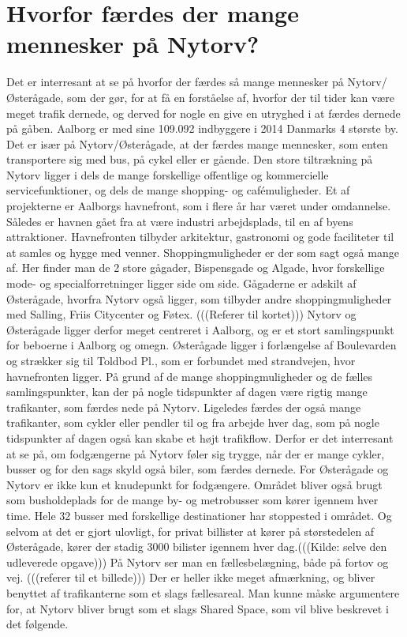 \section{Hvorfor færdes der mange mennesker på Nytorv?}
\label{sec:Hvorfor færdes der mange mennesker på Nytorv?}
Det er interresant at se på hvorfor der færdes så mange mennesker på Nytorv/Østerågade, som der gør, for at få en forståelse af, hvorfor der til tider kan være meget trafik dernede, og derved for nogle en give en utryghed i at færdes dernede på gåben.
Aalborg er med sine 109.092 indbyggere i 2014 Danmarks 4 største by.%
Det er især på Nytorv/Østerågade, at der færdes mange mennesker, som enten transportere sig med bus, på cykel eller er gående. Den store tiltrækning på Nytorv ligger i dels de mange forskellige offentlige og kommercielle servicefunktioner, og dels de mange shopping- og cafémuligheder. 
Et af projekterne er Aalborgs havnefront, som i flere år har været under omdannelse. Således er havnen gået fra at være industri arbejdsplads, til en af byens attraktioner. Havnefronten tilbyder arkitektur, gastronomi og gode faciliteter til at samles og hygge med venner.
Shoppingmuligheder er der som sagt også mange af. Her finder man de 2 store gågader, Bispensgade og Algade, hvor forskellige mode- og specialforretninger ligger side om side. Gågaderne er adskilt af Østerågade, hvorfra Nytorv også ligger, som tilbyder andre shoppingmuligheder med Salling, Friis Citycenter og Føtex. (((Referer til kortet)))
Nytorv og Østerågade ligger derfor meget centreret i Aalborg, og er et stort samlingspunkt for beboerne i Aalborg og omegn. Østerågade ligger i forlængelse af Boulevarden og strækker sig til Toldbod Pl., som er forbundet med strandvejen, hvor havnefronten ligger. På grund af de mange shoppingmuligheder og de fælles samlingspunkter, kan der på nogle tidspunkter af dagen være rigtig mange trafikanter, som færdes nede på Nytorv. Ligeledes færdes der også mange trafikanter, som cykler eller pendler til og fra arbejde hver dag, som på nogle tidspunkter af dagen også kan skabe et højt trafikflow. Derfor er det interresant at se på, om fodgængerne på Nytorv føler sig trygge, når der er mange cykler, busser og for den sags skyld også biler, som færdes dernede. For Østerågade og Nytorv er ikke kun et knudepunkt for fodgængere. Området bliver også brugt som busholdeplads for de mange by- og metrobusser som kører igennem hver time. Hele 32 busser med forskellige destinationer har stoppested i området. Og selvom at det er gjort ulovligt, for privat billister at kører på størstedelen af Østerågade, kører der stadig 3000 bilister igennem hver dag.(((Kilde: selve den udleverede opgave)))  På Nytorv ser man en fællesbelægning, både på fortov og vej. (((referer til et billede))) Der er heller ikke meget afmærkning, og bliver benyttet af trafikanterne som et slags fællesareal. Man kunne måske argumentere for, at Nytorv bliver brugt som et slags Shared Space, som vil blive beskrevet i det følgende. 
